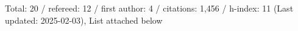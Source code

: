 Total: 20 / refereed: 12 / first author: 4 / citations: 1,456 / h-index: 11 (Last updated: 2025-02-03), List attached below